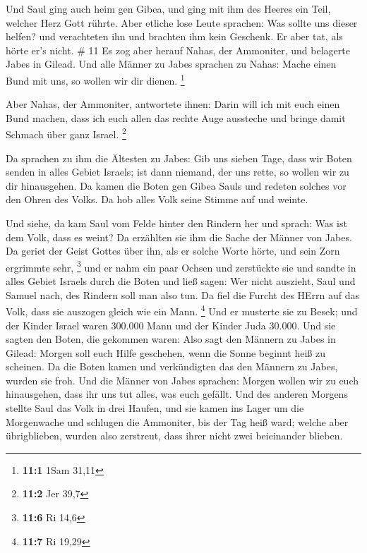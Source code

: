  Und Saul ging auch heim gen Gibea, und ging mit ihm des
Heeres ein Teil, welcher Herz Gott rührte.  Aber etliche
lose Leute sprachen: Was sollte uns dieser helfen? und verachteten ihn
und brachten ihm kein Geschenk. Er aber tat, als hörte er's nicht. \# 11
 Es zog aber herauf Nahas, der Ammoniter, und belagerte
Jabes in Gilead. Und alle Männer zu Jabes sprachen zu Nahas: Mache einen
Bund mit uns, so wollen wir dir dienen. \footnote{\textbf{11:1} 1Sam
  31,11}

 Aber Nahas, der Ammoniter, antwortete ihnen: Darin will ich
mit euch einen Bund machen, dass ich euch allen das rechte Auge
aussteche und bringe damit Schmach über ganz Israel. \footnote{\textbf{11:2}
  Jer 39,7}

 Da sprachen zu ihm die Ältesten zu Jabes: Gib uns sieben
Tage, dass wir Boten senden in alles Gebiet Israels; ist dann niemand,
der uns rette, so wollen wir zu dir hinausgehen.  Da kamen
die Boten gen Gibea Sauls und redeten solches vor den Ohren des Volks.
Da hob alles Volk seine Stimme auf und weinte.

 Und siehe, da kam Saul vom Felde hinter den Rindern her und
sprach: Was ist dem Volk, dass es weint? Da erzählten sie ihm die Sache
der Männer von Jabes.  Da geriet der Geist Gottes über ihn,
als er solche Worte hörte, und sein Zorn ergrimmte sehr, \footnote{\textbf{11:6}
  Ri 14,6}  und er nahm ein paar Ochsen und zerstückte sie
und sandte in alles Gebiet Israels durch die Boten und ließ sagen: Wer
nicht auszieht, Saul und Samuel nach, des Rindern soll man also tun. Da
fiel die Furcht des HErrn auf das Volk, dass sie auszogen gleich wie ein
Mann. \footnote{\textbf{11:7} Ri 19,29}  Und er musterte sie
zu Besek; und der Kinder Israel waren 300.000 Mann und der Kinder Juda
30.000.  Und sie sagten den Boten, die gekommen waren: Also
sagt den Männern zu Jabes in Gilead: Morgen soll euch Hilfe geschehen,
wenn die Sonne beginnt heiß zu scheinen. Da die Boten kamen und
verkündigten das den Männern zu Jabes, wurden sie froh. 
Und die Männer von Jabes sprachen: Morgen wollen wir zu euch
hinausgehen, dass ihr uns tut alles, was euch gefällt.  Und
des anderen Morgens stellte Saul das Volk in drei Haufen, und sie kamen
ins Lager um die Morgenwache und schlugen die Ammoniter, bis der Tag
heiß ward; welche aber übrigblieben, wurden also zerstreut, dass ihrer
nicht zwei beieinander blieben.


